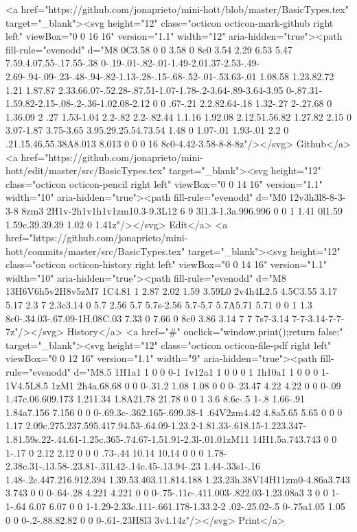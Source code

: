       <a href="https://github.com/jonaprieto/mini-hott/blob/master/BasicTypes.tex" target="_blank"><svg height="12" class="octicon octicon-mark-github right left" viewBox="0 0 16 16" version="1.1" width="12" aria-hidden="true"><path fill-rule="evenodd" d="M8 0C3.58 0 0 3.58 0 8c0 3.54 2.29 6.53 5.47 7.59.4.07.55-.17.55-.38 0-.19-.01-.82-.01-1.49-2.01.37-2.53-.49-2.69-.94-.09-.23-.48-.94-.82-1.13-.28-.15-.68-.52-.01-.53.63-.01 1.08.58 1.23.82.72 1.21 1.87.87 2.33.66.07-.52.28-.87.51-1.07-1.78-.2-3.64-.89-3.64-3.95 0-.87.31-1.59.82-2.15-.08-.2-.36-1.02.08-2.12 0 0 .67-.21 2.2.82.64-.18 1.32-.27 2-.27.68 0 1.36.09 2 .27 1.53-1.04 2.2-.82 2.2-.82.44 1.1.16 1.92.08 2.12.51.56.82 1.27.82 2.15 0 3.07-1.87 3.75-3.65 3.95.29.25.54.73.54 1.48 0 1.07-.01 1.93-.01 2.2 0 .21.15.46.55.38A8.013 8.013 0 0 0 16 8c0-4.42-3.58-8-8-8z"/></svg> Github</a>
      <a href="https://github.com/jonaprieto/mini-hott/edit/master/src/BasicTypes.tex" target="_blank"><svg height="12" class="octicon octicon-pencil right left" viewBox="0 0 14 16" version="1.1" width="10" aria-hidden="true"><path fill-rule="evenodd" d="M0 12v3h3l8-8-3-3-8 8zm3 2H1v-2h1v1h1v1zm10.3-9.3L12 6 9 3l1.3-1.3a.996.996 0 0 1 1.41 0l1.59 1.59c.39.39.39 1.02 0 1.41z"/></svg> Edit</a>
      <a href="https://github.com/jonaprieto/mini-hott/commits/master/src/BasicTypes.tex" target="_blank"><svg height="12" class="octicon octicon-history right left" viewBox="0 0 14 16" version="1.1" width="10" aria-hidden="true"><path fill-rule="evenodd" d="M8 13H6V6h5v2H8v5zM7 1C4.81 1 2.87 2.02 1.59 3.59L0 2v4h4L2.5 4.5C3.55 3.17 5.17 2.3 7 2.3c3.14 0 5.7 2.56 5.7 5.7s-2.56 5.7-5.7 5.7A5.71 5.71 0 0 1 1.3 8c0-.34.03-.67.09-1H.08C.03 7.33 0 7.66 0 8c0 3.86 3.14 7 7 7s7-3.14 7-7-3.14-7-7-7z"/></svg> History</a>
      <a  href="#" onclick="window.print();return false;" target="_blank"><svg height="12" class="octicon octicon-file-pdf right left" viewBox="0 0 12 16" version="1.1" width="9" aria-hidden="true"><path fill-rule="evenodd" d="M8.5 1H1a1 1 0 0 0-1 1v12a1 1 0 0 0 1 1h10a1 1 0 0 0 1-1V4.5L8.5 1zM1 2h4a.68.68 0 0 0-.31.2 1.08 1.08 0 0 0-.23.47 4.22 4.22 0 0 0-.09 1.47c.06.609.173 1.211.34 1.8A21.78 21.78 0 0 1 3.6 8.6c-.5 1-.8 1.66-.91 1.84a7.156 7.156 0 0 0-.69.3c-.362.165-.699.38-1 .64V2zm4.42 4.8a5.65 5.65 0 0 0 1.17 2.09c.275.237.595.417.94.53-.64.09-1.23.2-1.81.33-.618.15-1.223.347-1.81.59s.22-.44.61-1.25c.365-.74.67-1.51.91-2.3l-.01.01zM11 14H1.5a.743.743 0 0 1-.17 0 2.12 2.12 0 0 0 .73-.44 10.14 10.14 0 0 0 1.78-2.38c.31-.13.58-.23.81-.31l.42-.14c.45-.13.94-.23 1.44-.33s1-.16 1.48-.2c.447.216.912.394 1.39.53.403.11.814.188 1.23.23h.38V14H11zm0-4.86a3.743 3.743 0 0 0-.64-.28 4.221 4.221 0 0 0-.75-.11c-.411.003-.822.03-1.23.08a3 3 0 0 1-1-.64 6.07 6.07 0 0 1-1.29-2.33c.111-.661.178-1.33.2-2 .02-.25.02-.5 0-.75a1.05 1.05 0 0 0-.2-.88.82.82 0 0 0-.61-.23H8l3 3v4.14z"/></svg> Print</a>

